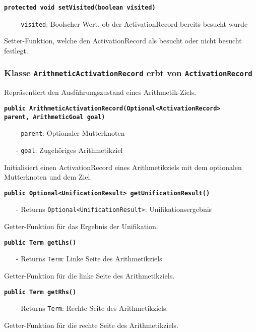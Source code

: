\documentclass[parskip=full,11pt,twoside]{scrartcl}
\begin{document}
\textbf{\texttt{protected void setVisited(boolean visited)}}
\begin{itemize}[noitemsep]
	\item[-] \texttt{visited}: Boolscher Wert, ob der ActivationRecord bereits besucht wurde
\end{itemize}
Setter-Funktion, welche den ActivationRecord als besucht oder nicht besucht festlegt.

\subsubsection{Klasse \texttt{ArithmeticActivationRecord} erbt von \texttt{ActivationRecord}}
Repräsentiert den Ausführungszustand eines Arithmetik-Ziels.

\textbf{\texttt{public ArithmeticActivationRecord(Optional<ActivationRecord>\\parent, ArithmeticGoal goal)}}
\begin{itemize}[noitemsep]
	\item[-] \texttt{parent}: Optionaler Mutterknoten
	\item[-] \texttt{goal}: Zugehöriges Arithmetikziel
\end{itemize}
Initialisiert einen ActivationRecord eines Arithmetikziels mit dem optionalen Mutterknoten und dem Ziel.

\textbf{\texttt{public Optional<UnificationResult> getUnificationResult()}}
\begin{itemize}[noitemsep]
	\item[-] Returns \texttt{Optional<UnificationResult>}: Unifikationsergebnis
\end{itemize}
Getter-Funktion für das Ergebnis der Unifikation.

\textbf{\texttt{public Term getLhs()}}
\begin{itemize}[noitemsep]
	\item[-] Returns \texttt{Term}: Linke Seite des Arithmetikziels
\end{itemize}
Getter-Funktion für die linke Seite des Arithmetikziels.

\textbf{\texttt{public Term getRhs()}}
\begin{itemize}[noitemsep]
	\item[-] Returns \texttt{Term}: Rechte Seite des Arithmetikziels.
\end{itemize}
Getter-Funktion für die rechte Seite des Arithmetikziels.
\end{document}
